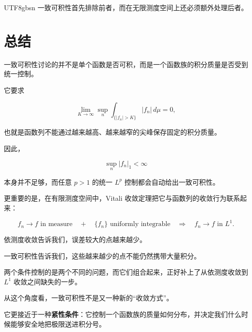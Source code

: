 \documentclass[11pt]{article}
\begin{document}
\begin{CJK*}{UTF8}{gbsn}
一致可积性首先排除前者，而在无限测度空间上还必须额外处理后者。


\section*{总结}


一致可积性讨论的并不是单个函数是否可积，而是一个函数族的积分质量是否受到统一控制。

它要求

\[
\lim_{K\to\infty}
\sup_n
\int_{\{|f_n|>K\}}
|f_n|\,d\mu
=
0,
\]

也就是函数列不能通过越来越高、越来越窄的尖峰保存固定的积分质量。

因此，

\[
\sup_n|f_n|_1<\infty
\]

本身并不足够，而任意 $p>1$ 的统一 $L^p$ 控制都会自动给出一致可积性。

更重要的是，在有限测度空间中，Vitali 收敛定理把它与函数列的收敛行为联系起来：

\[
\boxed{
f_n\to f\text{ in measure}
\quad+\quad
\{f_n\}\text{ uniformly integrable}
\quad\Longrightarrow\quad
f_n\to f\text{ in }L^1.
}
\]

依测度收敛告诉我们，误差较大的点越来越少。

一致可积性告诉我们，这些越来越少的点不能仍然携带大量积分。

两个条件控制的是两个不同的问题，而它们组合起来，正好补上了从依测度收敛到 $L^1$ 收敛之间缺失的一步。

从这个角度看，一致可积性不是又一种新的“收敛方式”。

它更接近于一种\textbf{紧性条件}：它控制一个函数族的质量如何分布，并决定我们什么时候能够安全地把极限送进积分号。

\end{CJK*}
\end{document}
